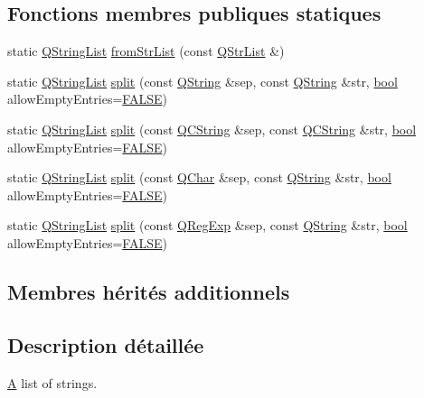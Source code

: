 \subsection*{Fonctions membres publiques statiques}
\begin{DoxyCompactItemize}
\item 
static \hyperlink{class_q_string_list}{Q\+String\+List} \hyperlink{class_q_string_list_a8afc2284556889d4ab1930626b55f8a2}{from\+Str\+List} (const \hyperlink{class_q_str_list}{Q\+Str\+List} \&)
\item 
static \hyperlink{class_q_string_list}{Q\+String\+List} \hyperlink{class_q_string_list_a2c21b167a54aa8a8082996d7f18ca5bd}{split} (const \hyperlink{class_q_string}{Q\+String} \&sep, const \hyperlink{class_q_string}{Q\+String} \&str, \hyperlink{qglobal_8h_a1062901a7428fdd9c7f180f5e01ea056}{bool} allow\+Empty\+Entries=\hyperlink{qglobal_8h_a10e004b6916e78ff4ea8379be80b80cc}{F\+A\+L\+S\+E})
\item 
static \hyperlink{class_q_string_list}{Q\+String\+List} \hyperlink{class_q_string_list_aa77dd3d336a00364cc748851d9b52398}{split} (const \hyperlink{class_q_c_string}{Q\+C\+String} \&sep, const \hyperlink{class_q_c_string}{Q\+C\+String} \&str, \hyperlink{qglobal_8h_a1062901a7428fdd9c7f180f5e01ea056}{bool} allow\+Empty\+Entries=\hyperlink{qglobal_8h_a10e004b6916e78ff4ea8379be80b80cc}{F\+A\+L\+S\+E})
\item 
static \hyperlink{class_q_string_list}{Q\+String\+List} \hyperlink{class_q_string_list_a57bbbd781091ae194b64138970497a87}{split} (const \hyperlink{class_q_char}{Q\+Char} \&sep, const \hyperlink{class_q_string}{Q\+String} \&str, \hyperlink{qglobal_8h_a1062901a7428fdd9c7f180f5e01ea056}{bool} allow\+Empty\+Entries=\hyperlink{qglobal_8h_a10e004b6916e78ff4ea8379be80b80cc}{F\+A\+L\+S\+E})
\item 
static \hyperlink{class_q_string_list}{Q\+String\+List} \hyperlink{class_q_string_list_a9392a3dfe579b24ee51cd4bd754801e1}{split} (const \hyperlink{class_q_reg_exp}{Q\+Reg\+Exp} \&sep, const \hyperlink{class_q_string}{Q\+String} \&str, \hyperlink{qglobal_8h_a1062901a7428fdd9c7f180f5e01ea056}{bool} allow\+Empty\+Entries=\hyperlink{qglobal_8h_a10e004b6916e78ff4ea8379be80b80cc}{F\+A\+L\+S\+E})
\end{DoxyCompactItemize}
\subsection*{Membres hérités additionnels}


\subsection{Description détaillée}
\hyperlink{class_a}{A} list of strings. 

